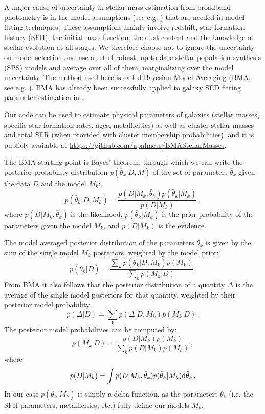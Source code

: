 A major cause of uncertainty in stellar mass estimation from broadband photometry is in the model assumptions (see e.g. \citealt{mitchell}) that are needed in model fitting techniques. These assumptions mainly involve redshift, star formation history (SFH), the initial mass function, the dust content and the knowledge of stellar evolution at all stages. 
We therefore choose not to ignore the uncertainty on model selection and use a set of robust, up-to-date stellar population synthesis (SPS) models and average over all of them, marginalizing over the model uncertainty. The method used here is called Bayesian Model Averaging (BMA, see e.g. \citealt{hoeting}). BMA has already been successfully applied to galaxy SED fitting  parameter estimation in \citet{taylor}.

Our code can be used to estimate physical parameters of galaxies (stellar masses, specific star formation rates, ages, metallicities) as well as cluster stellar masses and total SFR (when provided with cluster membership probabilities), and it is publicly available at \url{https://github.com/apalmese/BMAStellarMasses}.

The BMA  starting point is Bayes' theorem, through which we can write the posterior probability distribution $p(\bar{\theta}_k|D,M)$ of the set of parameters $\bar{\theta}_k$ given the data $D$ and the model $M_k$:
\begin{equation}
p(\bar{\theta}_k|D,M_k)=\frac{p(D|M_k,\bar{\theta}_k)p(\bar{\theta}_k|M_k)}{p(D|M_k)}\,,
\end{equation}
where  $p(D|M_k,\bar{\theta}_k)$ is the likelihood, $p(\bar{\theta}_k|M_k)$ is the prior probability of the parameters given the model $M_k$, and  $p(D|M_k)$ is the evidence.

The model averaged posterior distribution of the parameters $\theta_k$ is given by the sum of the single model $M_k$ posteriors, weighted by the model prior:
\begin{equation}
p(\bar{\theta}_k|D)=\frac{\sum_kp(\bar{\theta}_k|D,M_k) p(M_k)}{\sum_k p(M_k|D)}\,.
\end{equation}
From BMA it also follows that the  posterior distribution of a  quantity $\Delta$ is the average of the single model posteriors  for that quantity,  weighted by their posterior model probability:
\begin{equation}
p(\Delta|D)=\sum_kp(\Delta|D,M_k) p(M_k|D)\,.\label{bmaeq}
\end{equation}
The posterior model probabilities can be computed by:
\begin{equation}
p(M_k|D)=\frac{p(D|M_k) p(M_k)}{\sum_k p(D|M_k) p(M_k)}\,,
\end{equation}
where
\begin{equation}
p(D|M_k)=\int p(D|M_k,\bar{\theta}_k)p(\bar{\theta}_k|M_k){\rm d}\bar{\theta}_k\,.\label{bmaeq}
\end{equation}
In our case $p(\bar{\theta}_k|M_k)$ is simply a delta function, as the parameters  $\bar{\theta}_k$ (i.e. the SFH parameters, metallicities, etc.) fully  define our models $M_k$.

